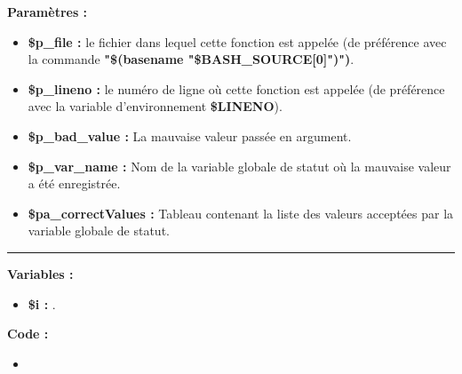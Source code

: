 \documentclass[a4paper,10pt]{article}
\begin{document}
\begin{justify}
    \textbf{Paramètres :}\\
    \begin{itemize}
        \item \textbf{\color{orange}\$p\_file\color{white} :} le fichier dans lequel cette fonction est appelée (de préférence avec la commande \textbf{\textbf{"\$(\color{gray}basename \color{white}"\color{orange}\$BASH\_SOURCE[0]\color{white}")")}}.\setlength{\parskip}{1em}

        \item \textbf{\color{orange}\$p\_lineno\color{white} :} le numéro de ligne où cette fonction est appelée (de préférence avec la variable d'environnement \textbf{\color{orange}\$LINENO}).

        \item \textbf{\color{orange}\$p\_bad\_value\color{white} :} La mauvaise valeur passée en argument\color{white}.

        \item \textbf{\color{orange}\$p\_var\_name\color{white} :}  Nom de la variable globale de statut où la mauvaise valeur a été enregistrée.\color{white}

        \item \textbf{\color{orange}\$pa\_correctValues\color{white} :} Tableau contenant la liste des valeurs acceptées par la variable globale de statut.
    \end{itemize}
\end{justify}\setlength{\parskip}{2em}

\par\noindent\rule{\textwidth}{0.4pt}

\begin{justify}\setlength{\parskip}{1em}
    \textbf{Variables :}

    \begin{itemize}
        \item \textbf{\color{orange}\$i\color{white} :} .
    \end{itemize}
\end{justify}

\begin{justify}
    \textbf{Code :}
    \begin{itemize}
        \item 
    \end{itemize}

\end{justify}


\end{document}
